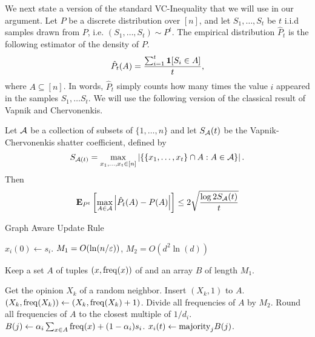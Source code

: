 We next state a version of the standard VC-Inequality that we will use
in our argument.  Let $P$ be a discrete distribution over $[n]$, and let
$S_1, \ldots, S_t$ be $t$ i.i.d samples drawn from $P$, i.e.
$(S_1, \ldots, S_t) \sim P^t$.  The empirical distribution $\hat{P}_t$ is the
following estimator of the density of $P$.
\begin{equation}\label{eq:empirical_distribution}
  \hat{P}_t(A) = \frac{\sum_{i=1}^t \bm{1}{\left[S_i \in A\right]}}{t},
\end{equation}
where $A \subseteq [n]$. In words, $\hat{P}_t$ simply counts
how many times the value $i$ appeared in the samples $S_1, \ldots S_t$.
We will use the following version of the classical result of Vapnik and
Chervonenkis.
\begin{lemma}\label{l:vc_inequality}
  Let $\mathcal{A}$ be a collection of subsets of $\{1,\ldots, n\}$ and let
  $S_{\mathcal{A}}(t)$ be the Vapnik-Chervonenkis shatter coefficient, defined
  by
  \[
    S_{\mathcal{A}(t)} = \max_{x_1,\ldots, x_t \in [n]}
    \left| \{ \{x_1, \ldots, x_t\} \cap A : A \in \mathcal{A} \} \right|.
  \]
  Then
  \[
    \bm{\mathrm{E}}_{P^t} \left[ \max_{A \in \mathcal{A}} \left| \hat{P}_t(A) - P(A) \right| \right]
    \leq 2 \sqrt{\frac{\log{2 S_{\mathcal{A}}(t)}}{t}}
  \]
\end{lemma}

\begin{algorithm}
  \caption{Graph Aware Update Rule}
  \label{alg:frequencies}
  \begin{algorithmic}[1]
    \STATE $x_i(0) \gets s_i$.
    \STATE $M_1 = O(\ln(n/\varepsilon))$, $M_2 = O(d^2 \ln(d))$

    \STATE Keep a set $A$ of tuples $(x, \mathrm{freq}(x))$
    of and an array $B$ of length $M_1$.


    \STATE Get the opinion $X_k$ of a random neighbor.
    \STATE Insert $(X_k, 1)$ to $A$.
    \ELSE
    \STATE $(X_k, \mathrm{freq}(X_k))
    \gets (X_k,  \mathrm{freq}(X_k) +1) $.
  \ENDIF
\ENDFOR
\STATE Divide all frequencies of $A$ by $M_2$.  \label{alg:line:counters}
\STATE Round all frequencies of $Α$ to the closest multiple of $1/d_i$.
\STATE $B(j) \gets \alpha_i \sum_{x \in A} \mathrm{freq}(x) + (1-\alpha_i) s_i$.
\ENDFOR
\STATE $x_i(t) \gets \mathrm{majority}_j B(j)$.
\ENDFOR
\end{algorithmic}
\end{algorithm}

